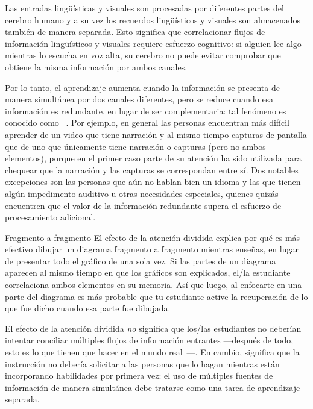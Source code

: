 Las entradas lingüísticas y visuales son procesadas por diferentes partes del cerebro humano
y a su vez los recuerdos lingüísticos y visuales son almacenados también de manera separada.
Esto significa que correlacionar flujos de información lingüísticos y visuales requiere esfuerzo cognitivo:
si alguien lee algo mientras lo escucha en voz alta,
su cerebro no puede evitar comprobar que obtiene la misma información por ambos canales.

Por lo tanto, el aprendizaje aumenta cuando la información se presenta de manera simultánea por dos canales diferentes,
pero se reduce cuando esa información es redundante, en lugar de ser complementaria:
tal fenómeno es conocido como ~\cite{Maye2003}.
Por ejemplo, en general las personas encuentran más difícil aprender de un video que tiene narración y
al mismo tiempo capturas de pantalla que de uno que únicamente tiene narración o capturas (pero no ambos elementos),
porque en el primer caso parte de su atención ha sido utilizada para chequear que la narración  
y las capturas se correspondan entre sí. Dos notables excepciones 
son las personas que aún no hablan bien un idioma y las que tienen algún impedimento auditivo u
otras necesidades especiales, quienes quizás encuentren que el valor de la información redundante
supera el esfuerzo de procesamiento adicional.

\begin{aside}{Fragmento a fragmento}
  El efecto de la atención dividida explica por qué es más efectivo dibujar un diagrama
  fragmento a fragmento mientras enseñas, en lugar de presentar todo el gráfico de una sola vez.
  Si las partes de un diagrama aparecen al mismo tiempo en que los gráficos son explicados,
  el/la estudiante correlaciona ambos elementos en su memoria.
  Así que luego, al enfocarte en una parte del diagrama es más probable que tu estudiante active la recuperación
  de lo que fue dicho cuando esa parte fue dibujada.
\end{aside}

El efecto de la atención dividida \emph{no} significa
que los/las estudiantes no deberían intentar conciliar múltiples flujos de información entrantes —después de todo, esto es lo que tienen que hacer en el mundo real~\cite{Atki2000}—.
En cambio, significa que la instrucción no debería solicitar a las personas
que lo hagan mientras están incorporando habilidades por primera vez:
el uso de múltiples fuentes  de información de manera simultánea debe tratarse como una tarea de aprendizaje separada.

